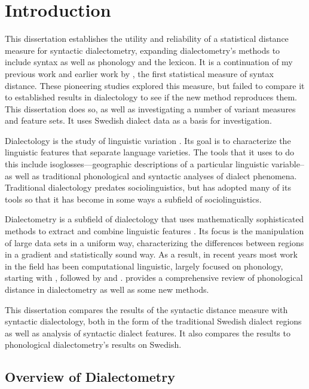 \chapter{Introduction}
\label{background-chapter}

This dissertation establishes the utility and reliability of a
statistical distance measure for syntactic dialectometry, expanding
dialectometry's methods to include syntax as well as phonology and the
lexicon. It is a continuation of my previous work \cite{sanders07,sanders08b} and earlier work by , the first
statistical measure of syntax distance. These pioneering studies
explored this measure, but failed to compare it to established results
in dialectology to see if the new method reproduces them. This
dissertation does so, as well as investigating a number of variant
measures and feature sets. It uses Swedish dialect data as a basis for
investigation.

Dialectology is the study of linguistic variation \cite{chambers98}.
Its goal is to characterize the linguistic features that separate
language varieties. The tools that it uses to do this include
isoglosses---geographic descriptions of a particular linguistic
variable--as well as traditional phonological and syntactic analyses
of dialect phenomena. Traditional dialectology predates
sociolinguistics, but has adopted many of its tools so that it has
become in some ways a subfield of sociolinguistics.

Dialectometry is a subfield of dialectology that uses mathematically
sophisticated methods to extract and combine linguistic features
\cite{seguy73}. Its focus is the manipulation of large data sets in a
uniform way, characterizing the differences between regions in a
gradient and statistically sound way. As a result, in recent years most
work in the field has been computational linguistic, largely focused
on phonology, starting with , followed by
 and . 
provides a comprehensive review of phonological distance in
dialectometry as well as some new methods.

This dissertation compares the results of the syntactic distance
measure with syntactic dialectology, both in the form of the traditional
Swedish dialect regions as well as analysis of syntactic dialect
features. It also compares the results to phonological dialectometry's
results on Swedish.

\section{Overview of Dialectometry}

